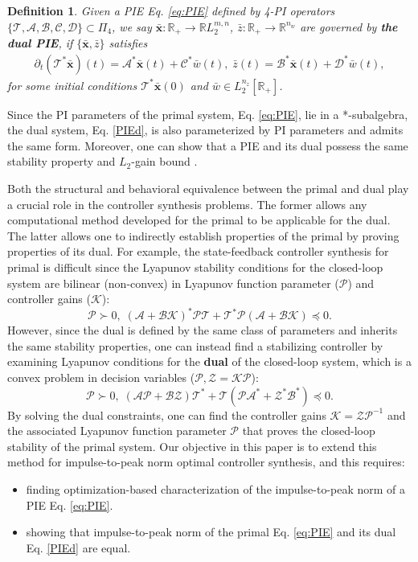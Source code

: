 \documentclass[letterpaper, 10 pt, conference]{ieeeconf}
\newtheorem{definition}{Definition}
\newcommand{\R}{\mathbb{R}}
\newcommand{\mcl}[1]{\mathcal{#1}}
\newcommand{\mbf}[1]{\mathbf{#1}}
\theoremstyle{definition}
\begin{document}
\begin{definition}\label{def:dualPIE}
Given a PIE Eq. \eqref{eq:PIE} defined by 4-PI operators $\{\mcl T, \mcl A,\mcl B, \mcl C,\mcl D\}\subset \Pi_4$, we say $\bar{\mbf x}:\R_+\to \R L_2^{m,n}$, $\bar z:\R_+\to \R^{n_w}$ are governed by \textbf{the dual PIE}, if $\{\bar{\mbf x},\bar z\}$ satisfies 
\begin{align}
\partial_t(\mcl T^*  \bar{\mbf x})(t)\!=\! \mcl A^* \bar{\mbf x}(t)\!+\!\mcl C^* \bar{w}(t),\; \bar{z}(t)\!=\!\mcl B^*  \bar{\mbf x}(t)\!+\!\mcl D^*\bar w(t), \label{PIEd}
\end{align}
for some initial conditions $\mcl T^*\bar{\mbf x}(0)$ and $\bar w\in L_2^{n_z}[\R_+]$.
\end{definition}
    Since the PI parameters of the primal system, Eq. \eqref{eq:PIE}, lie in a *-subalgebra, the dual system, Eq. \eqref{PIEd}, is also parameterized by PI parameters and admits the same form. Moreover, one can show that a PIE and its dual possess the same stability property and $L_2$-gain bound \cite{shivakumar_dual_2024}.%

Both the structural and behavioral equivalence between the primal and dual play a crucial role in the controller synthesis problems. The former allows any computational method developed for the primal to be applicable for the dual. The latter allows one to indirectly establish properties of the primal by proving properties of its dual. For example, the state-feedback controller synthesis for primal is difficult since the Lyapunov stability conditions for the closed-loop system are bilinear (non-convex) in Lyapunov function parameter ($\mcl P$) and controller gains ($\mcl K$): 
\[
\mcl P\succ 0, \; (\mcl A+\mcl B\mcl K)^*\mcl P\mcl T+\mcl T^*\mcl P(\mcl A+\mcl B\mcl K) \preceq 0.
\]
However, since the dual is defined by the same class of parameters and inherits the same stability properties, one can instead find a stabilizing controller by examining Lyapunov conditions for the \textbf{dual} of the closed-loop system, which is a convex problem in decision variables ($\mcl P, \mcl Z=\mcl K\mcl P$):
\[
\mcl P\succ 0, \; (\mcl A\mcl P+\mcl B\mcl Z)\mcl T^*+\mcl T(\mcl P\mcl A^*+\mcl Z^*\mcl B^*) \preceq 0.
\]
By solving the dual constraints, one can find the controller gains $\mcl K = \mcl Z\mcl P^{-1}$ and the associated Lyapunov function parameter $\mcl P$ that proves the closed-loop stability of the primal system. Our objective in this paper is to extend this method for impulse-to-peak norm optimal controller synthesis, and this requires:
\begin{itemize}
    \item finding optimization-based characterization of the impulse-to-peak norm of a PIE Eq. \eqref{eq:PIE}.
    \item showing that impulse-to-peak norm of the primal Eq. \eqref{eq:PIE} and its dual Eq. \eqref{PIEd} are equal.
\end{itemize}
\end{document}
